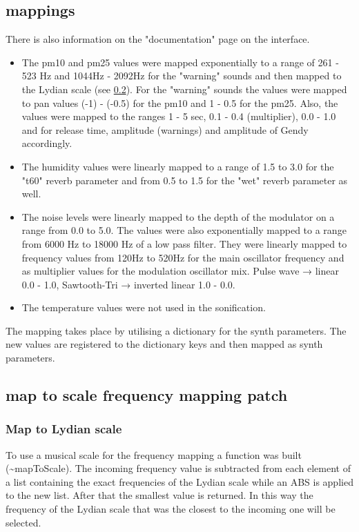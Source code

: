 \documentclass[11pt]{article}
\begin{document}
\subsection{mappings}
\label{sec:orgd309a99}
There is also information on the "documentation" page on the interface.

\begin{itemize}
\item The pm10 and pm25 values were mapped exponentially to a range of 261 - 523 Hz and 1044Hz - 2092Hz for the "warning" sounds and then mapped to the Lydian scale (see \ref{sec:org30cc356}).  For the "warning" sounds the values were mapped to pan values (-1) - (-0.5) for the pm10 and 1 - 0.5 for the pm25.  Also, the values were mapped to the ranges 1 - 5 sec, 0.1 - 0.4 (multiplier), 0.0 - 1.0 and for release time, amplitude (warnings) and amplitude of Gendy accordingly.
\item The humidity values were linearly mapped to a range of 1.5 to 3.0 for the "t60" reverb parameter and from 0.5 to 1.5 for the "wet" reverb parameter as well.
\item The noise levels were linearly mapped to the depth of the modulator on a range from 0.0 to 5.0.  The values were also exponentially mapped to a range from 6000 Hz to 18000 Hz of a low pass filter.  They were linearly mapped to frequency values from 120Hz to 520Hz for the main oscillator frequency and as multiplier values for the modulation oscillator mix.  Pulse wave → linear 0.0 - 1.0, Sawtooth-Tri → inverted linear 1.0 - 0.0.
\item The temperature values were not used in the sonification.
\end{itemize}

The mapping takes place by utilising a dictionary for the synth parameters.  The new values are registered to the dictionary keys and then mapped as synth parameters.
\subsection{map to scale frequency mapping patch}
\label{sec:org30cc356}
\subsubsection{Map to Lydian scale}
\label{sec:orgd62ef50}
To use a musical scale for the frequency mapping a function was built (\textasciitilde{}mapToScale).  The incoming frequency value is subtracted from each element of a list containing the exact frequencies of the Lydian scale while an ABS is applied to the new list.  After that the smallest value is returned.  In this way the frequency of the Lydian scale that was the closest to the incoming one will be selected.
\end{document}
